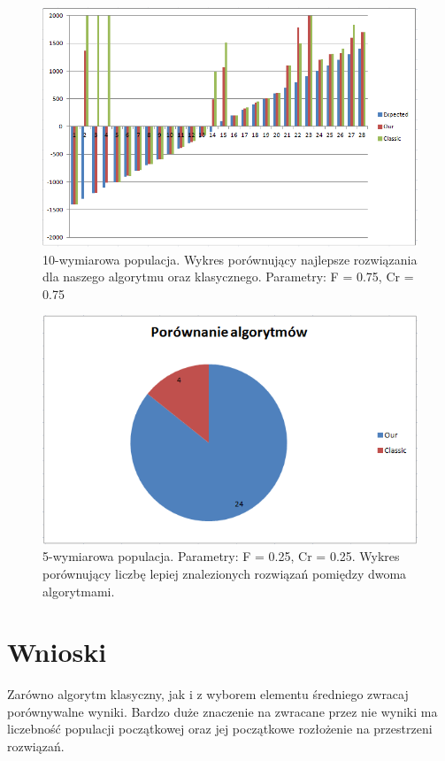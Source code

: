 \documentclass[a4paper]{article}
\begin{document}
\begin{figure}[!h]
\centering
\includegraphics[width=\textwidth]{F75Cr75L10chart.png}
\caption{10-wymiarowa populacja. Wykres porównujący najlepsze rozwiązania dla naszego algorytmu oraz klasycznego. Parametry: F = 0.75, Cr = 0.75}
\end{figure}

\begin{figure}[!h]
\centering
\includegraphics[width=\textwidth]{F75Cr75L10statystyka.png}
\caption{5-wymiarowa populacja. Parametry: F = 0.25, Cr = 0.25. Wykres porównujący liczbę lepiej znalezionych rozwiązań pomiędzy dwoma algorytmami.}
\end{figure}

\clearpage{}
\section{Wnioski}
Zarówno algorytm klasyczny, jak i z wyborem elementu średniego zwracaj porównywalne wyniki. Bardzo duże znaczenie na zwracane przez nie wyniki ma liczebność populacji początkowej oraz jej początkowe rozłożenie na przestrzeni rozwiązań. 
\end{document}
